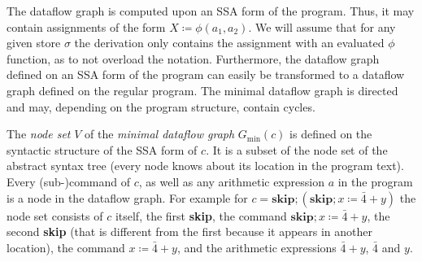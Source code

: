 The dataflow graph is computed upon an SSA form of the program.
Thus, it may contain assignments of the form $X \coloneqq \phi(a_1, a_2)$.
We will assume that for any given store $\sigma$ the derivation only contains 
the assignment with an evaluated $\phi$ function, as to not overload the notation.
Furthermore, the dataflow graph defined on an SSA form of the program can easily 
be transformed to a dataflow graph defined on the regular program.
The minimal dataflow graph is directed and may, depending on the 
program structure, contain cycles.

The \emph{node set} $V$ of the \emph{minimal dataflow graph} $G_\text{min}(c)$
is defined on the syntactic structure
of the SSA form of $c$. It is a subset of the node set of the abstract syntax tree
(every node knows about its location in the program text).
Every (sub-)command of $c$, as well as any arithmetic expression $a$ in the 
program is a node in the dataflow graph.
For example for
$c = \textbf{skip}; (\textbf{skip}; x \coloneqq \bar{4} + y)$
the node set consists of $c$ itself, the first \textbf{skip}, the command 
$\textbf{skip}; x \coloneqq \bar{4} + y$, the second \textbf{skip} (that is different 
from the first because it appears in another location), the command
$x \coloneqq \bar{4} + y$, and the arithmetic expressions $\bar{4}+y$,
$\bar{4}$ and $y$.


